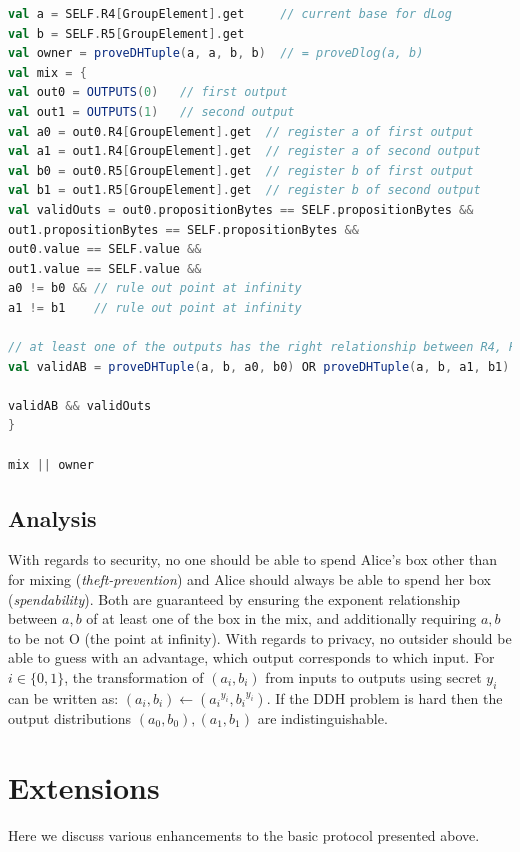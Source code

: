 \documentclass[runningheads]{llncs}
\begin{document}
\begin{lstlisting}[language=Scala,caption={Mix-script},label=mixScript]
val a = SELF.R4[GroupElement].get     // current base for dLog
val b = SELF.R5[GroupElement].get
val owner = proveDHTuple(a, a, b, b)  // = proveDlog(a, b)
val mix = {
val out0 = OUTPUTS(0)   // first output
val out1 = OUTPUTS(1)   // second output
val a0 = out0.R4[GroupElement].get  // register a of first output
val a1 = out1.R4[GroupElement].get  // register a of second output
val b0 = out0.R5[GroupElement].get  // register b of first output
val b1 = out1.R5[GroupElement].get  // register b of second output
val validOuts = out0.propositionBytes == SELF.propositionBytes &&
out1.propositionBytes == SELF.propositionBytes &&
out0.value == SELF.value &&
out1.value == SELF.value &&
a0 != b0 && // rule out point at infinity
a1 != b1    // rule out point at infinity

// at least one of the outputs has the right relationship between R4, R5
val validAB = proveDHTuple(a, b, a0, b0) OR proveDHTuple(a, b, a1, b1)

validAB && validOuts
}

mix || owner
\end{lstlisting}

\subsection{Analysis}

With regards to security, no one should be able to spend Alice's box other than for mixing ({\em theft-prevention}) and Alice should always be able to spend her box ({\em spendability}). Both are guaranteed by ensuring the exponent relationship between $a, b$ of at least one of the box in the mix, and additionally requiring $a, b$ to be not O (the point at infinity). With regards to privacy, no outsider should be able to guess with an advantage, which output corresponds to which input. For $i \in \{0, 1\}$, the transformation of $(a_i, b_i)$ from inputs to outputs using secret $y_i$ can be written as:
$(a_i, b_i) \leftarrow ({a_i}^{y_i}, {b_i}^{y_i})$. If the DDH problem is hard then the output distributions $(a_0, b_0), (a_1, b_1)$ are indistinguishable.

\section{Extensions}

Here we discuss various enhancements to the basic protocol presented above.
\end{document}
